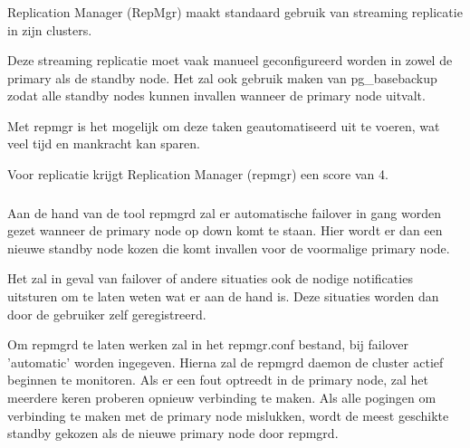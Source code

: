 
\subsubsection{}
\label{subsubsec:Replicatie}

Replication Manager (RepMgr) maakt standaard gebruik van streaming replicatie in zijn clusters.

Deze streaming replicatie moet vaak manueel geconfigureerd worden in zowel de primary als de standby node. Het zal ook gebruik maken van pg\_basebackup zodat alle standby nodes kunnen invallen wanneer de primary node uitvalt.

Met repmgr is het mogelijk om deze taken geautomatiseerd uit te voeren, wat veel tijd en mankracht kan sparen.

Voor replicatie krijgt Replication Manager (repmgr) een score van 4.

\subsubsection{}
\label{subsubsec:Failover}


Aan de hand van de tool repmgrd zal er automatische failover in gang worden gezet wanneer de primary node op down komt te staan. Hier wordt er dan een nieuwe standby node kozen die komt invallen voor de voormalige primary node.  

Het zal in geval van failover of andere situaties ook de nodige notificaties uitsturen om te laten weten wat er aan de hand is. Deze situaties worden dan door de gebruiker zelf geregistreerd.

Om repmgrd te laten werken zal in het repmgr.conf bestand, bij failover 'automatic' worden ingegeven. Hierna zal de repmgrd daemon de cluster actief beginnen te monitoren. Als er een fout optreedt in de primary node, zal het meerdere keren proberen opnieuw verbinding te maken. Als alle pogingen om verbinding te maken met de primary node mislukken, wordt de meest geschikte standby gekozen als de nieuwe primary node door repmgrd.

